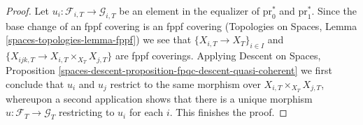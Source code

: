 \documentclass{stacks-project}
\theoremstyle{plain}
\theoremstyle{definition}
\theoremstyle{remark}
\numberwithin{equation}{subsection}
\begin{document}
\begin{proof}
Let $u_i : \mathcal{F}_{i, T} \to \mathcal{G}_{i, T}$ be an element in the
equalizer of $\text{pr}_0^*$ and $\text{pr}_1^*$. Since the base change
of an fppf covering is an fppf covering
(Topologies on Spaces, Lemma \ref{spaces-topologies-lemma-fppf})
we see that $\{X_{i, T} \to X_T\}_{i \in I}$ and
$\{X_{ijk, T} \to X_{i, T} \times_{X_T} X_{j, T}\}$ are fppf coverings.
Applying Descent on Spaces, Proposition
\ref{spaces-descent-proposition-fpqc-descent-quasi-coherent}
we first conclude that $u_i$ and $u_j$ restrict to the same morphism
over $X_{i, T} \times_{X_T} X_{j, T}$, whereupon a second application
shows that there is a unique morphism $u : \mathcal{F}_T \to \mathcal{G}_T$
restricting to $u_i$ for each $i$. This finishes the proof.
\end{proof}
\end{document}
